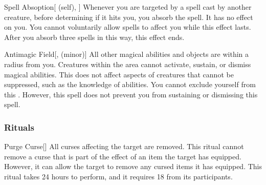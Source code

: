 \lowercase{\hypertarget{spell:Spell Absoption}{}}\label{spell:Spell Absoption}
\begin{attuneability}[Rank 7]{\hypertarget{spell:Spell Absoption}{Spell Absoption}}[ (self), ]
Whenever you are targeted by a spell cast by another creature, before determining if it hits you, you absorb the spell.
It has no effect on you.
You cannot voluntarily allow spells to affect you while this effect lasts.
After you absorb three spells in this way, this effect ends.

\end{attuneability}
\vspace{0.25em}



\lowercase{\hypertarget{spell:Antimagic Field}{}}\label{spell:Antimagic Field}
\begin{freeability}[Rank 8]{\hypertarget{spell:Antimagic Field}{Antimagic Field}}[,  (minor)]
All other magical abilities and objects are  within a \areamed radius  from you.
Creatures within the area cannot activate, sustain, or dismiss magical abilities.
This does not affect aspects of creatures that cannot be suppressed, such as the knowledge of abilities.
You cannot exclude yourself from this .
However, this spell does not prevent you from sustaining or dismissing this spell.

\end{freeability}
\vspace{0.25em}



\subsubsection{Rituals}


\lowercase{\hypertarget{spell:Purge Curse}{}}\label{spell:Purge Curse}
\begin{freeability}[Rank 3]{\hypertarget{spell:Purge Curse}{Purge Curse}}[]
All curses affecting the target are removed.
This ritual cannot remove a curse that is part of the effect of an item the target has equipped.
However, it can allow the target to remove any cursed items it has equipped.
This ritual takes 24 hours to perform, and it requires 18  from its participants.
\end{freeability}
\vspace{0.25em}


